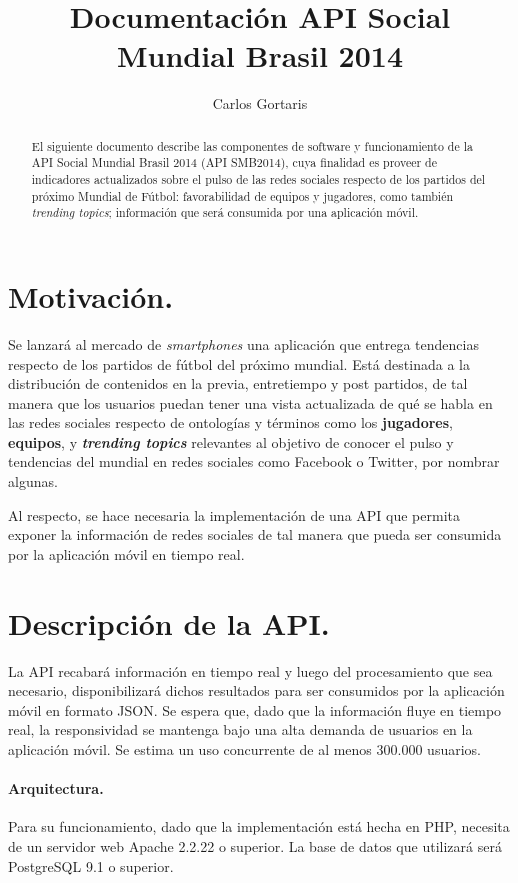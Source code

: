 \documentclass[11pt,spanish]{article}
\begin{document}
\author{Carlos Gortaris}
\title{Documentación API Social Mundial Brasil 2014}

\maketitle

\begin{abstract}
El siguiente documento describe las componentes de software y funcionamiento de la API Social Mundial Brasil 2014 (API SMB2014), cuya finalidad es proveer de indicadores actualizados sobre el pulso de las redes sociales respecto de los partidos del próximo Mundial de Fútbol: favorabilidad de equipos y jugadores, como también \emph{trending topics}; información que será consumida por una aplicación móvil. 
\end{abstract}

\section{Motivación.}
Se lanzará al mercado de \emph{smartphones} una aplicación que entrega tendencias respecto de los partidos de fútbol del próximo mundial. Está destinada a la distribución de contenidos en la previa, entretiempo y post partidos, de tal manera que los usuarios puedan tener una vista actualizada de qué se habla en las redes sociales respecto de ontologías y términos como los \textbf{jugadores}, \textbf{equipos}, y \textbf{\emph{trending topics}} relevantes al objetivo de conocer el pulso y tendencias del mundial en redes sociales como Facebook o Twitter, por nombrar algunas.

Al respecto, se hace necesaria la implementación de una API que permita exponer la información de redes sociales de tal manera que pueda ser consumida por la aplicación móvil en tiempo real.

\section{Descripción de la API.}
La API recabará información en tiempo real y luego del procesamiento que sea necesario, disponibilizará dichos resultados para ser consumidos por la aplicación móvil en formato JSON. Se espera que, dado que la información fluye en tiempo real, la responsividad se mantenga bajo una alta demanda de usuarios en la aplicación móvil. Se estima un uso concurrente de al menos 300.000 usuarios.

\paragraph{Arquitectura.}
Para su funcionamiento, dado que la implementación está hecha en PHP, necesita de un servidor web Apache 2.2.22 o superior. La base de datos que utilizará será PostgreSQL 9.1 o superior.
\end{document}
